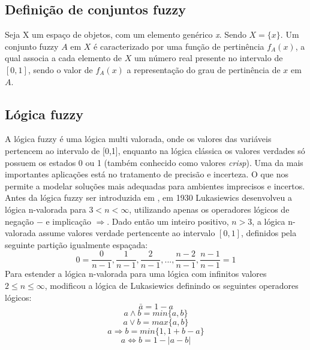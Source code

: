 \subsection{Definição de conjuntos fuzzy}

Seja X um espaço de objetos, com um elemento genérico {\it x\/}.  Sendo $X= \big\{x\big\}$.
Um conjunto fuzzy $A$ em $X$ é caracterizado por uma função de pertinência $f_A(x)$, a qual associa
a cada elemento de $X$ um número real presente no intervalo de $[0,1]$, sendo o valor de $f_A(x)$ a
representação do grau de pertinência de $x$ em $A$.

\subsection{Lógica fuzzy}

A lógica fuzzy é uma lógica multi valorada, onde os valores das variáveis pertencem ao intervalo de
[0,1], enquanto na lógica clássica os valores verdades só possuem os estados 0 ou 1 (também
conhecido como valores {\it crisp\/}). Uma da mais importantes aplicações está no tratamento de
precisão e incerteza. O que nos permite a modelar soluções mais adequadas para ambientes imprecisos
e incertos.  Antes da lógica fuzzy ser introduzida em \cite{Zadeh1965}, em 1930
Lukasiewics\cite{Chen2000} desenvolveu a lógica n-valorada para $3 < n < \infty$, utilizando apenas
os operadores lógicos de negação $-$ e implicação $\Rightarrow$. Dado então um inteiro positivo, $n
> 3$, a lógica n-valorada assume valores verdade pertencente ao intervalo $[0,1]$, definidos pela
seguinte partição igualmente espaçada: $$0 =  \frac{0}{n-1},
\frac{1}{n-1},\frac{2}{n-1},...,\frac{n-2}{n-1},\frac{n-1}{n-1} = 1$$ Para estender a lógica
n-valorada para uma lógica com infinitos valores $2 \leq n \leq \infty$, \cite{Zadeh1965} modificou
a lógica de Lukasiewics definindo os seguintes operadores lógicos: $$\bar{a} = 1 -a$$ $$a \wedge b =
min\{a,b\}$$ $$a \vee b = max\{a,b\}$$ $$a \Rightarrow b = min\{1, 1+b-a\}$$ $$a \Leftrightarrow  b
= 1 - |a-b|$$

